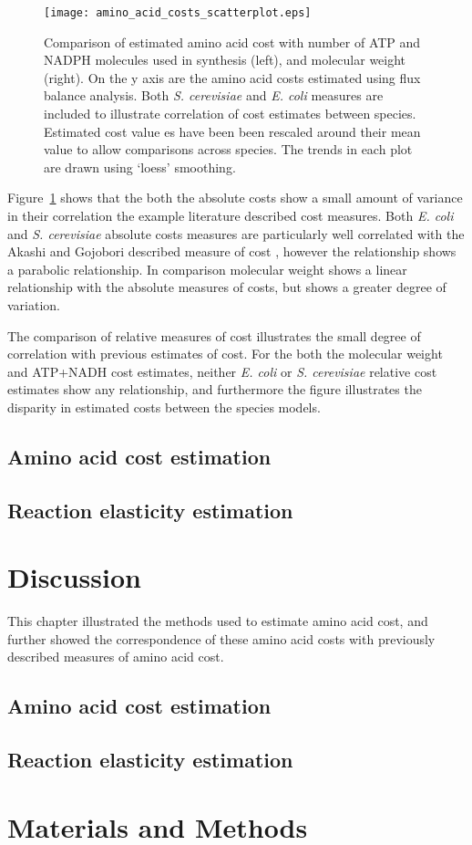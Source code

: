 \begin{figure}
\centering
\texttt{[image: amino\_acid\_costs\_scatterplot.eps]}
\caption[Comparison of the genome scale model derived cost data sets.]{Comparison of estimated amino acid cost with number of ATP and NADPH molecules used in synthesis (left), and molecular weight (right). On the y axis are the amino acid costs estimated using flux balance analysis. Both \emph{S. cerevisiae} and \emph{E. coli} measures are included to illustrate correlation of cost estimates between species. Estimated cost value
es have been been rescaled around their mean value to allow comparisons across species. The trends in each plot are drawn using `loess' smoothing.}
\label{figure:amino_acid_costs_scatterplot}
\end{figure}

Figure~\ref{figure:amino_acid_costs_scatterplot} shows that the both the absolute costs show a small amount of variance in their correlation the example literature described cost measures. Both \emph{E. coli} and \emph{S. cerevisiae} absolute costs measures are particularly well correlated with the Akashi and Gojobori described measure of cost \cite{akashi2002}, however the relationship shows a parabolic relationship. In comparison molecular weight shows a linear relationship with the absolute measures of costs, but shows a greater degree of variation.

The comparison of relative measures of cost illustrates the small degree of correlation with previous estimates of cost. For the both the molecular weight and ATP+NADH cost estimates, neither \emph{E. coli} or \emph{S. cerevisiae} relative cost estimates show any relationship, and furthermore the figure illustrates the disparity in estimated costs between the species models.

\subsection{Amino acid cost estimation}

\subsection{Reaction elasticity estimation}

\section{Discussion}

This chapter illustrated the methods used to estimate amino acid cost, and further showed the correspondence of these amino acid costs with previously described measures of amino acid cost.

\subsection{Amino acid cost estimation}

\subsection{Reaction elasticity estimation}

\section{Materials and Methods}
